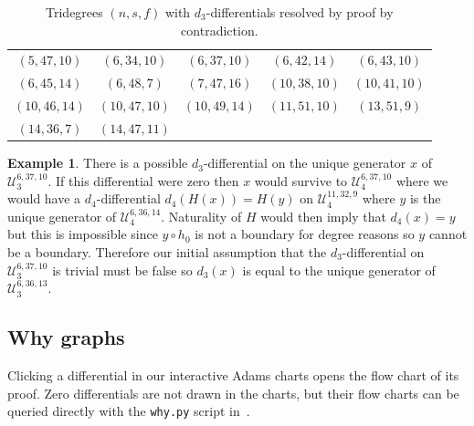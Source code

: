 \documentclass[dvipsnames,table]{amsart}
\theoremstyle{definition}
\newtheorem{example}[theorem]{Example}
\theoremstyle{remark}
\numberwithin{equation}{section}
\begin{document}
\begin{table}[H]
\centering
\caption{Tridegrees $(n, s, f)$ with $d_3$-differentials resolved by proof by contradiction.}
\label{tab:contradiction-tridegrees}
\begin{tabular}{ccccc}
$(5, 47, 10)$ & $(6, 34, 10)$ & $(6, 37, 10)$ & $(6, 42, 14)$ & $(6, 43, 10)$ \\
$(6, 45, 14)$ & $(6, 48, 7)$ & $(7, 47, 16)$ & $(10, 38, 10)$ & $(10, 41, 10)$ \\
$(10, 46, 14)$ & $(10, 47, 10)$ & $(10, 49, 14)$ & $(11, 51, 10)$ & $(13, 51, 9)$ \\
$(14, 36, 7)$ & $(14, 47, 11)$ \\
\end{tabular}
\end{table}

\begin{example}
  There is a possible $d_3$-differential on the unique generator $x$ of $\mathcal{U}_3^{6, 37, 10}.$ If this differential were zero then $x$ would survive to $\mathcal{U}_4^{6, 37, 10}$ where we would have a $d_4$-differential $d_4(H(x)) = H(y)$ on $\mathcal{U}_4^{11, 32, 9}$ where $y$ is the unique generator of $\mathcal{U}_4^{6, 36, 14}.$ Naturality of $H$ would then imply that $d_4(x) = y$ but this is impossible since $y \circ h_0$ is not a boundary for degree reasons so $y$ cannot be a boundary. Therefore our initial assumption that the $d_3$-differential on $\mathcal{U}_3^{6, 37, 10}$ is trivial must be false so $d_3(x)$ is equal to the unique generator of $\mathcal{U}_3^{6, 36, 13}.$
\end{example}



\subsection{Why graphs}
Clicking a differential in our interactive Adams charts opens the flow chart of its proof. Zero differentials are not drawn in the charts, but their flow charts can be queried directly with the \texttt{why.py} script in~\cite{ehpreprint_data}.

\newpage
\end{document}
